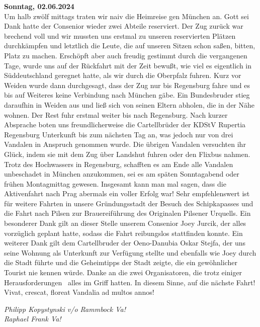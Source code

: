 \begin{multicols}{2}
\textbf{Sonntag, 02.06.2024}\\
Um halb zwölf mittags traten wir naiv die Heimreise gen München an. Gott sei Dank hatte der Consenior wieder zwei Abteile reserviert. Der Zug zurück war brechend voll und wir mussten
uns erstmal zu unseren reservierten Plätzen durchkämpfen und letztlich die Leute, die auf unseren Sitzen schon saßen, bitten, Platz zu machen. Erschöpft aber auch freudig gestimmt durch die vergangenen Tage, wurde uns auf der Rückfahrt mit der Zeit bewußt, wie viel es eigentlich in Süddeutschland geregnet hatte, als wir durch die Oberpfalz fuhren. Kurz vor Weiden wurde dann durchgesagt, dass der Zug nur bis Regensburg fahre und es bis auf Weiteres keine Verbindung nach München gäbe. Ein Bundesbruder stieg daraufhin in Weiden aus und ließ sich von seinen Eltern abholen, die in der Nähe wohnen. Der Rest fuhr erstmal weiter bis nach Regensburg. Nach kurzer Absprache boten uns freundlicherweise die Cartellbrüder der KDStV Rupertia Regensburg Unterkunft bis zum nächsten Tag an, was jedoch nur von drei Vandalen in Anspruch genommen wurde. Die übrigen Vandalen versuchten ihr Glück, indem sie mit dem Zug über Landshut fuhren oder den Flixbus nahmen. Trotz des Hochwassers in Regensburg, schafften es am Ende alle Vandalen unbeschadet in München anzukommen, sei es am späten Sonntagabend oder frühen Montagmittag gewesen.
Insgesamt kann man mal sagen, dass die Aktivenfahrt nach Prag abermals ein voller Erfolg war! Sehr empfehlenswert ist für weitere Fahrten in unsere Gründungsstadt der Besuch des Schipkapasses und die Fahrt nach Pilsen zur Brauereiführung des Originalen Pilsener Urquells. Ein besonderer Dank gilt an dieser Stelle unserem Consenior Joey Jurcik, der alles vorzüglich geplant hatte, sodass die Fahrt reibungslos stattfinden konnte. Ein weiterer Dank gilt dem Cartellbruder der Oeno-Danubia Oskar Stejfa, der uns seine Wohnung als Unterkunft zur Verfügung stellte und ebenfalls wie Joey durch die Stadt führte und die Geheimtipps der Stadt zeigte, die ein gewöhnlicher Tourist nie kennen würde. Danke an die zwei Organisatoren, die trotz einiger \glqq Herausforderungen\grqq ~ alles im Griff hatten.
In diesem Sinne, auf die nächste Fahrt!\\
Vivat, crescat, floreat Vandalia ad multos annos!

\end{multicols}

\begin{flushright}
		\hfill\emph{Philipp Kopystynski v/o Rammbock Va!\\ Raphael Frank Va!}
	\end{flushright}
			

	

%
